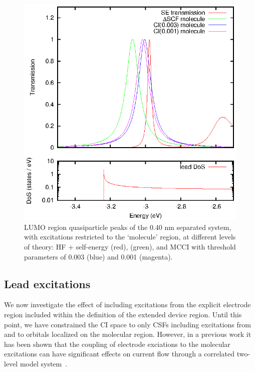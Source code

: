 \begin{figure}
	\begin{center}
		\includegraphics[width=0.9\linewidth]{figures/figure7a_7b}
	\end{center}
	\caption{LUMO region quasiparticle peaks of the 0.40 nm separated
	         system, with excitations restricted to the `molecule' region,
		 at different levels of theory: HF + self-energy (red),
		 \dscf (green), and MCCI with threshold parameters of
		 0.003 (blue) and 0.001 (magenta).}
	\label{fig:all40Alumo}
\end{figure}

\subsection{Lead excitations}
We now investigate the effect of including excitations from the
explicit electrode region included within the definition of the extended
device region. Until this point, we have constrained the CI space to only
\acp{CSF} including excitations from and to orbitals localized on the
molecular region. However, in a previous work it has been shown that the
coupling of electrode exciations to the molecular excitations can have
significant effects on current flow through a correlated two-level model
system~\cite{galperin_nitzan2006leadexcitations}. 

